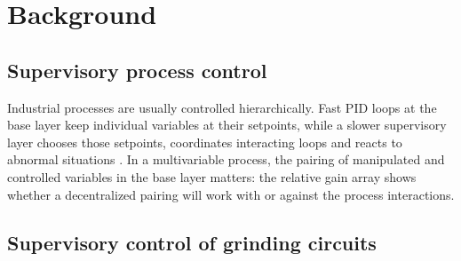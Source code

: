 \chapter{Background}
\label{ch:background}

\section{Supervisory process control}
\label{sec:bg-supervisory}
Industrial processes are usually controlled hierarchically. Fast PID loops at
the base layer keep individual variables at their setpoints, while a slower
supervisory layer chooses those setpoints, coordinates interacting loops and
reacts to abnormal situations \cite{astrom2011,pomerleau2000}. In a
multivariable process, the pairing of manipulated and controlled variables
in the base layer matters: the relative gain array \cite{bristol1966} shows
whether a decentralized pairing will work with or against the process
interactions.

\section{Supervisory control of grinding circuits}
\label{sec:bg-grinding}

